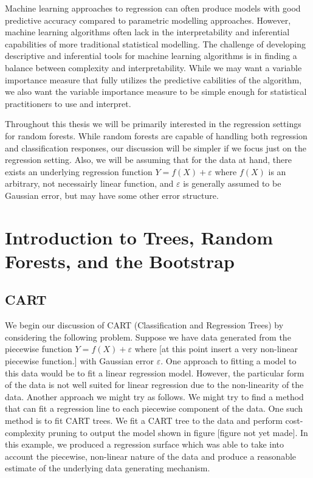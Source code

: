 \documentclass[12pt,twoside]{reedthesis}
\theoremstyle{definition}
\theoremstyle{definition}
\theoremstyle{definition}
\theoremstyle{remark}
\begin{document}
Machine learning approaches to regression can often produce models with
good predictive accuracy compared to parametric modelling approaches.
However, machine learning algorithms often lack in the interpretability
and inferential capabilities of more traditional statistical modelling.
The challenge of developing descriptive and inferential tools for
machine learning algorithms is in finding a balance between complexity
and interpretability. While we may want a variable importance measure
that fully utilizes the predictive cabilities of the algorithm, we also
want the variable importance measure to be simple enough for statistical
practitioners to use and interpret. \par

Throughout this thesis we will be primarily interested in the regression
settings for random forests. While random forests are capable of
handling both regression and classification responses, our discussion
will be simpler if we focus just on the regression setting. Also, we
will be assuming that for the data at hand, there exists an underlying
regression function \(Y=f(X)+\varepsilon\) where \(f(X)\) is an
arbitrary, not necessairly linear function, and \(\varepsilon\) is
generally assumed to be Gaussian error, but may have some other error
structure. \par

\chapter{Introduction to Trees, Random Forests, and the
Bootstrap}\label{rmd-basics}

\section{CART}\label{cart}

We begin our discussion of CART (Classification and Regression Trees) by
considering the following problem. Suppose we have data generated from
the piecewise function \(Y=f(X)+\varepsilon\) where {[}at this point
insert a very non-linear piecewise function.{]} with Gaussian error
\(\varepsilon\). One approach to fitting a model to this data would be
to fit a linear regression model. However, the particular form of the
data is not well suited for linear regression due to the non-linearity
of the data. Another approach we might try as follows. We might try to
find a method that can fit a regression line to each piecewise component
of the data. One such method is to fit CART trees. We fit a CART tree to
the data and perform cost-complexity pruning to output the model shown
in figure {[}figure not yet made{]}. In this example, we produced a
regression surface which was able to take into account the piecewise,
non-linear nature of the data and produce a reasonable estimate of the
underlying data generating mechanism. \par
\end{document}
